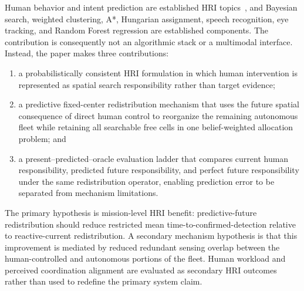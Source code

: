 \documentclass[conference]{IEEEtran}
\begin{document}
Human behavior and intent prediction are established HRI topics~\cite{b2,b3,b4},
and Bayesian search, weighted clustering, A*, Hungarian assignment, speech
recognition, eye tracking, and Random Forest regression are established
components. The contribution is consequently not an algorithmic stack or a
multimodal interface. Instead, the paper makes three contributions:

\begin{enumerate}
\item a probabilistically consistent HRI formulation in which human
      intervention is represented as spatial search responsibility rather
      than target evidence;
\item a predictive fixed-center redistribution mechanism that uses the future
      spatial consequence of direct human control to reorganize the remaining
      autonomous fleet while retaining all searchable free cells in one
      belief-weighted allocation problem; and
\item a present--predicted--oracle evaluation ladder that compares current
      human responsibility, predicted future responsibility, and perfect
      future responsibility under the same redistribution operator, enabling
      prediction error to be separated from mechanism limitations.
\end{enumerate}

The primary hypothesis is mission-level HRI benefit: predictive-future
redistribution should reduce restricted mean time-to-confirmed-detection
relative to reactive-current redistribution. A secondary mechanism hypothesis
is that this improvement is mediated by reduced redundant sensing overlap
between the human-controlled and autonomous portions of the fleet. Human
workload and perceived coordination alignment are evaluated as secondary HRI
outcomes rather than used to redefine the primary system claim.
\end{document}
